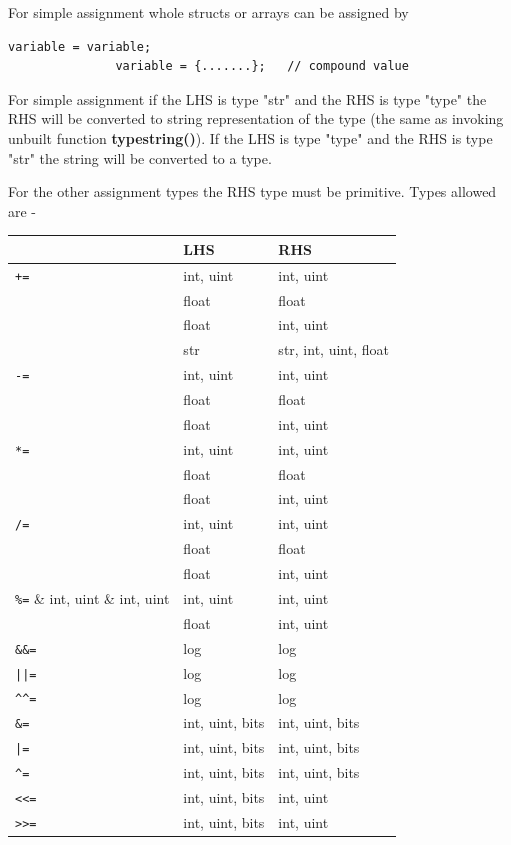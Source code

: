         For simple assignment whole structs or arrays can be assigned by
        \begin{lstlisting}[gobble=8, language=threepl]
               variable = variable;
               variable = {.......};   // compound value
        \end{lstlisting}
        
        For simple assignment if the LHS is type "str" and the RHS is
        type "type" the RHS will be converted to string representation of the
        type (the same as invoking unbuilt function {\bf typestring()}).
        If the LHS is type "type" and the RHS is type "str" the string will
        be converted to a type.

        For the other assignment types the RHS type must be primitive. Types
        allowed are -

        \begin{tabular}{| l | l | l |}
        \hline
                  & LHS & RHS  \\
        \hline
        \hline
        \verb'+=' & int, uint & int, uint  \\
                  & float & float  \\
                  & float & int, uint  \\
                  & str & str, int, uint, float  \\
        \hline
        \verb'-=' & int, uint & int, uint \\
                  & float & float  \\
                  & float & int, uint  \\
        \hline
        \verb'*=' & int, uint & int, uint \\
                  & float & float  \\
                  & float & int, uint  \\
        \hline
        \verb'/=' & int, uint & int, uint \\
                  & float & float  \\
                  & float & int, uint  \\
        \hline
        \verb'%=' & int, uint & int, uint \\
                  & float & int, uint  \\
        \hline
        \verb'&&=' & log & log \\
        \hline
        \verb'||=' & log & log \\
        \hline
        \verb'^^=' & log & log \\
        \hline
        \verb'&=' & int, uint, bits & int, uint, bits \\
        \hline
        \verb'|=' & int, uint, bits & int, uint, bits \\
        \hline
        \verb'^=' & int, uint, bits & int, uint, bits \\
        \hline
        \verb'<<=' & int, uint, bits & int, uint \\
        \hline
        \verb'>>=' & int, uint, bits & int, uint \\
        \hline
        \end{tabular}

